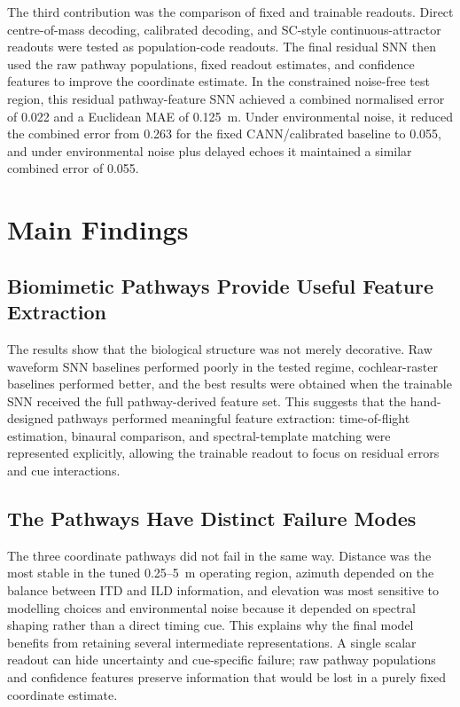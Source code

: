 The third contribution was the comparison of fixed and trainable readouts. Direct centre-of-mass decoding, calibrated decoding, and SC-style continuous-attractor readouts were tested as population-code readouts. The final residual SNN then used the raw pathway populations, fixed readout estimates, and confidence features to improve the coordinate estimate. In the constrained noise-free test region, this residual pathway-feature SNN achieved a combined normalised error of 0.022 and a Euclidean MAE of 0.125~m. Under environmental noise, it reduced the combined error from 0.263 for the fixed CANN/calibrated baseline to 0.055, and under environmental noise plus delayed echoes it maintained a similar combined error of 0.055.

\section{Main Findings}

\subsection{Biomimetic Pathways Provide Useful Feature Extraction}

The results show that the biological structure was not merely decorative. Raw waveform SNN baselines performed poorly in the tested regime, cochlear-raster baselines performed better, and the best results were obtained when the trainable SNN received the full pathway-derived feature set. This suggests that the hand-designed pathways performed meaningful feature extraction: time-of-flight estimation, binaural comparison, and spectral-template matching were represented explicitly, allowing the trainable readout to focus on residual errors and cue interactions.

\subsection{The Pathways Have Distinct Failure Modes}

The three coordinate pathways did not fail in the same way. Distance was the most stable in the tuned 0.25--5~m operating region, azimuth depended on the balance between ITD and ILD information, and elevation was most sensitive to modelling choices and environmental noise because it depended on spectral shaping rather than a direct timing cue. This explains why the final model benefits from retaining several intermediate representations. A single scalar readout can hide uncertainty and cue-specific failure; raw pathway populations and confidence features preserve information that would be lost in a purely fixed coordinate estimate.

